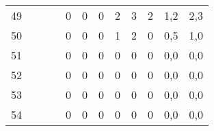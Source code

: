 \begin{center}
\begin{longtable}{|c|c|c|c|c|c|c|c|c|c|c|c|}
		49 &   &   &   & 0  & 0  & 0  & 2   & 3   & 2   & 1,2      & 2,3    \\
		50 &   &   &   & 0  & 0  & 0  & 1   & 2   & 0   & 0,5      & 1,0    \\
		51 &   &   &   & 0  & 0  & 0  & 0   & 0   & 0   & 0,0      & 0,0    \\
		52 &   &   &   & 0  & 0  & 0  & 0   & 0   & 0   & 0,0      & 0,0    \\
		53 &   &   &   & 0  & 0  & 0  & 0   & 0   & 0   & 0,0      & 0,0    \\
		54 &   &   &   & 0  & 0  & 0  & 0   & 0   & 0   & 0,0      & 0,0   
	\end{longtable}
\end{center}

